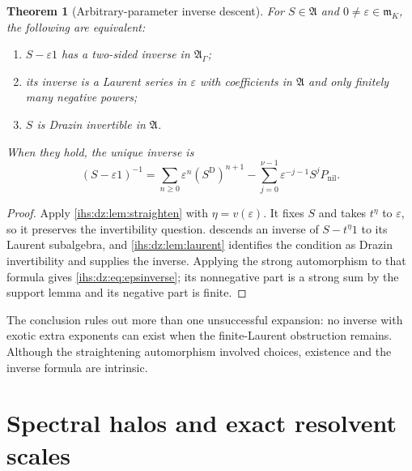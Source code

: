 \documentclass[11pt,a4paper]{article}
\numberwithin{equation}{section}
\newtheorem{theorem}{Theorem}[section]
\theoremstyle{definition}
\theoremstyle{remark}
\newcommand{\mK}{\mathfrak m_K}
\newcommand{\eps}{\varepsilon}
\newcommand{\Alg}{\mathfrak A}
\newcommand{\AlgG}{\mathfrak A_\Gamma}
\begin{document}
\begin{theorem}[Arbitrary-parameter inverse descent]\label{ihs:dz:thm:descent}
For $S\in\Alg$ and $0\ne\eps\in\mK$, the following are equivalent:
\begin{enumerate}[label=\textup{(\roman*)}]
\item $S-\eps1$ has a two-sided inverse in $\AlgG$;
\item its inverse is a Laurent series in $\eps$ with coefficients in $\Alg$
 and only finitely many negative powers;
\item $S$ is Drazin invertible in $\Alg$.
\end{enumerate}
When they hold, the unique inverse is
\begin{equation}\label{ihs:dz:eq:epsinverse}
 (S-\eps1)^{-1}=\sum_{n\ge0}\eps^n(S^{\mathrm D})^{n+1}
                -\sum_{j=0}^{\nu-1}\eps^{-j-1}S^jP_{\mathrm{nil}}.
\end{equation}
\end{theorem}
\begin{proof}
Apply \cref{ihs:dz:lem:straighten} with $\eta=v(\eps)$. It fixes $S$ and
takes $t^\eta$ to $\eps$, so it preserves the invertibility question.
 descends an inverse of $S-t^\eta1$ to its
Laurent subalgebra, and \cref{ihs:dz:lem:laurent} identifies the condition as
Drazin invertibility and supplies the inverse. Applying the strong
automorphism to that formula gives \eqref{ihs:dz:eq:epsinverse}; its
nonnegative part is a strong sum by the support lemma and its negative part
is finite.
\end{proof}

The conclusion rules out more than one unsuccessful expansion: no inverse
with exotic extra exponents can exist when the finite-Laurent obstruction
remains. Although the straightening automorphism involved choices,
existence and the inverse formula are intrinsic.

\section{Spectral halos and exact resolvent scales}\label{ihs:dz:sec:halo}
\end{document}
